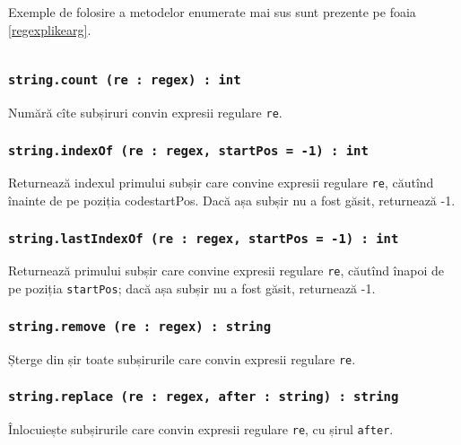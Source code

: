 Exemple de folosire a metodelor enumerate mai sus sunt prezente pe foaia \ref{regexplikearg}.

\begin{sourcecode}
    \label{regexplikearg}
    \inputminted[linenos]{icl}{../sources/regexplikearg.icL}
\end{sourcecode}

\subsubsection{\texttt{string.count (re : regex) : int}}

Numără cîte subșiruri convin expresii regulare \texttt{re}.

\subsubsection{\texttt{string.indexOf (re : regex, startPos = -1) : int}}

Returnează indexul primului subșir care convine expresii regulare \texttt{re}, căutînd înainte de pe poziția code{startPos}. Dacă așa subșir nu a fost găsit, returnează -1.

\subsubsection{\texttt{string.lastIndexOf (re : regex, startPos = -1) : int}}

Returnează primului subșir care convine expresii regulare \texttt{re}, căutînd înapoi de pe poziția \texttt{startPos}; dacă așa subșir nu a fost găsit, returnează -1.

\subsubsection{\texttt{string.remove (re : regex) : string}}

Șterge din șir toate subșirurile care convin expresii regulare \texttt{re}.

\subsubsection{\texttt{string.replace (re : regex, after : string) : string}}

Înlocuiește subșirurile care convin expresii regulare \texttt{re}, cu șirul \texttt{after}.

